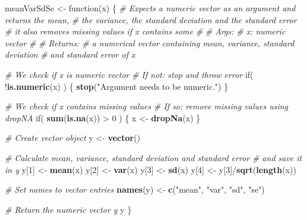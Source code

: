 \documentclass[11,]{article}
\newenvironment{Shaded}{\begin{snugshade}}{\end{snugshade}}
\newcommand{\KeywordTok}[1]{\textcolor[rgb]{0.13,0.29,0.53}{\textbf{{#1}}}}
\newcommand{\DecValTok}[1]{\textcolor[rgb]{0.00,0.00,0.81}{{#1}}}
\newcommand{\StringTok}[1]{\textcolor[rgb]{0.31,0.60,0.02}{{#1}}}
\newcommand{\CommentTok}[1]{\textcolor[rgb]{0.56,0.35,0.01}{\textit{{#1}}}}
\newcommand{\NormalTok}[1]{{#1}}
\begin{document}
\begin{Shaded}
\begin{Highlighting}[]
\NormalTok{meanVarSdSe <-}\StringTok{ }\NormalTok{function(x) \{}
  \CommentTok{# Expects a numeric vector as an argument and returns the mean,}
  \CommentTok{# the variance, the standard deviation and the standard error}
  \CommentTok{# it also removes missing values if x contains some}
  \CommentTok{# }
  \CommentTok{# Args:}
  \CommentTok{#   x: numeric vector}
  \CommentTok{#}
  \CommentTok{# Returns:}
  \CommentTok{#   a numerical vector containing mean, variance, standard deviation}
  \CommentTok{#   and standard error of x}
  
  \CommentTok{# We check if x is numeric vector}
  \CommentTok{# If not: stop and throw error}
  \NormalTok{if( !}\KeywordTok{is.numeric}\NormalTok{(x) ) \{}
    \KeywordTok{stop}\NormalTok{(}\StringTok{"Argument needs to be numeric."}\NormalTok{)}
  \NormalTok{\}}
  
  \CommentTok{# We check if x contains missing values}
  \CommentTok{# If so: remove missing values using dropNA}
  \NormalTok{if( }\KeywordTok{sum}\NormalTok{(}\KeywordTok{is.na}\NormalTok{(x)) >}\StringTok{ }\DecValTok{0} \NormalTok{) \{}
    \NormalTok{x <-}\StringTok{ }\KeywordTok{dropNa}\NormalTok{(x)}
  \NormalTok{\}}
  
  \CommentTok{# Create vector object}
  \NormalTok{y <-}\StringTok{ }\KeywordTok{vector}\NormalTok{()}
  
  \CommentTok{# Calculate mean, variance, standard deviation and standard error}
  \CommentTok{# and save it in y}
  \NormalTok{y[}\DecValTok{1}\NormalTok{] <-}\StringTok{ }\KeywordTok{mean}\NormalTok{(x)}
  \NormalTok{y[}\DecValTok{2}\NormalTok{] <-}\StringTok{ }\KeywordTok{var}\NormalTok{(x)}
  \NormalTok{y[}\DecValTok{3}\NormalTok{] <-}\StringTok{ }\KeywordTok{sd}\NormalTok{(x)}
  \NormalTok{y[}\DecValTok{4}\NormalTok{] <-}\StringTok{ }\NormalTok{y[}\DecValTok{3}\NormalTok{]/}\KeywordTok{sqrt}\NormalTok{(}\KeywordTok{length}\NormalTok{(x))}
  
  \CommentTok{# Set names to vector entries}
  \KeywordTok{names}\NormalTok{(y) <-}\StringTok{ }\KeywordTok{c}\NormalTok{(}\StringTok{"mean"}\NormalTok{, }\StringTok{"var"}\NormalTok{, }\StringTok{"sd"}\NormalTok{, }\StringTok{"se"}\NormalTok{)}
  
  \CommentTok{# Return the numeric vector y}
  \NormalTok{y}
\NormalTok{\}}
\end{Highlighting}
\end{Shaded}
\end{document}
